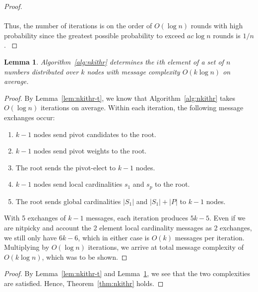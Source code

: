 \documentclass[11pt,epsf]{article}
\newtheorem{lemma}{Lemma}
\begin{document}
{{\begin{proof}
      \paragraph{}{
        Thus, the number of iterations is on the order of $O(\log n)$ rounds with
        high probability since the greatest possible probability to exceed $ac \log n$
        rounds is $1/n$.
      }
    \end{proof}
    \begin{lemma}
      \label{lem:nkithr-m}
      Algorithm~\ref{alg:nkithr} determines the $i$th element of a set of $n$ numbers
      distributed over $k$ nodes with message complexity $O(k \log n)$ on average.
    \end{lemma}
    \begin{proof}
      By Lemma~\ref{lem:nkithr-t}, we know that Algorithm~\ref{alg:nkithr} takes
      $O(\log n)$ iterations on average. Within each iteration, the following message exchanges occur:
      \begin{enumerate}
      \item{$k - 1$ nodes send pivot candidates to the root.}
      \item{$k - 1$ nodes send pivot weights to the root.}
      \item{The root sends the pivot-elect to $k - 1$ nodes.}
      \item{$k - 1$ nodes send local cardinalities $s_1$ and $s_p$ to the root.}
      \item{The root sends global cardinalities $|S_1|$ and $|S_1| + |P|$ to $k - 1$ nodes.}
      \end{enumerate}
      With 5 exchanges of $k - 1$ messages, each iteration produces $5k - 5$. Even if we are
      nitpicky and account the 2 element local cardinality messages as 2 exchanges, we still
      only have $6k - 6$, which in either case is $O(k)$ messages per iteration. Multiplying
      by $O(\log n)$ iterations, we arrive at total message complexity of $O(k \log n)$,
      which was to be shown.
    \end{proof}
    \begin{proof}
      By Lemma~\ref{lem:nkithr-t} and Lemma~\ref{lem:nkithr-m}, we see that the two
      complexities are satisfied. Hence, Theorem~\ref{thm:nkithr} holds.
    \end{proof}
  }
}
\end{document}
